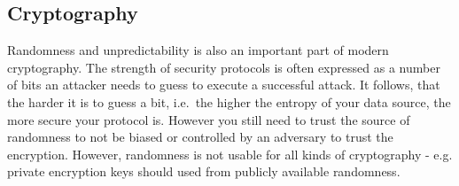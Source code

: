 \subsection{Cryptography}\label{subsec:usecase_cryptography}
Randomness and unpredictability is also an important part of modern cryptography. The strength of security protocols is often expressed as a number of bits an attacker needs to guess to execute a successful attack. It follows, that the harder it is to guess a bit, i.e.\ the higher the entropy of your data source, the more secure your protocol is. However you still need to trust the source of randomness to not be biased or controlled by an adversary to trust the encryption. 
However, randomness is not usable for all kinds of cryptography - e.g. private encryption keys should used from publicly available randomness. 
